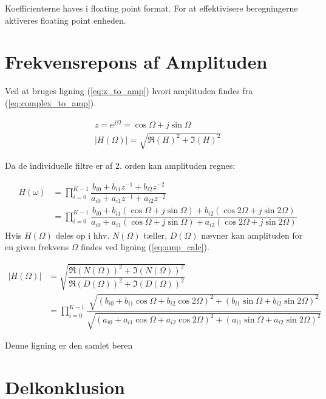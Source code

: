    Koefficienterne haves i floating point format. For at effektivisere beregningerne aktiveres floating point 
   enheden. 


\section{Frekvensrepons af Amplituden}

Ved at bruges ligning (\ref{eq:z_to_amp}) hvori amplituden findes fra (\ref{eq:complex_to_amp}).

\begin{align}
    z= e^{j \Omega} = \cos{\Omega} + j \sin{\Omega}  
    \label{eq:z_to_amp}\\
    |H(\Omega)| = \sqrt{ \Re{(H)}^2  + \Im{(H) }^2 }
    \label{eq:complex_to_amp}
\end{align}

Da de individuelle filtre er af 2. orden kan amplituden regnes:

\begin{align}
    H(\omega) &= \prod\limits_{i=0}^{K-1} \dfrac{b_{i0} + b_{i1} z^{-1} + b_{i2} z^{-2}}{a_{i0} + a_{i1} z^{-1} + a_{i2} z^{-2}}
    \\ &= \prod\limits_{i=0}^{K-1} \dfrac{b_{i0} + b_{i1} \left( \cos{\Omega} + j \sin{\Omega} \right)+b_{i2} \left( \cos{2\Omega} + j \sin{2\Omega} \right)}{a_{i0} + a_{i1} \left( \cos{\Omega} + j \sin{\Omega} \right)+a_{i2} \left( \cos{2\Omega} + j \sin{2\Omega} \right)}
\end{align}
Hvis $H(\Omega)$ deles op i hhv. $N(\Omega)$ tæller, $D(\Omega)$ nævner kan amplituden for en 
given frekvens $\Omega$ findes ved ligning (\ref{eq:amp_calc}).

\begin{align}
    |H(\Omega)| &= \sqrt{ \dfrac{\Re{(N(\Omega))}^2 + \Im{(N(\Omega))}^2 }{\Re{(D(\Omega))}^2 + \Im{(D(\Omega))}^2 }}\\
     &= \prod\limits_{i=0}^{K-1} \dfrac{ \sqrt{\left( b_{i0} + b_{i1} \cos{\Omega} + b_{i2} \cos{2 \Omega} \right)^2 +  \left( b_{i1} \sin{\Omega} + b_{i2} \sin{2 \Omega} \right)^2 } }{ \sqrt{\left( a_{i0} + a_{i1} \cos{\Omega} + a_{i2} \cos{2 \Omega} \right)^2 + \left( a_{i1} \sin{\Omega} + a_{i2} \sin{2 \Omega} \right)^2} }
    \label{eq:amp_calc}
\end{align}

Denne ligning er den samlet beren

\section{Delkonklusion}

